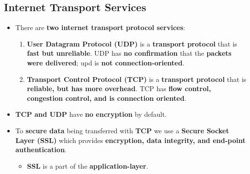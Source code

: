 \documentclass[16pt]{article}
\begin{document}
    \subsection*{Internet Transport Services}
    \begin{itemize}
        \item There are \textbf{two internet transport protocol services}:
        \begin{enumerate}
            \item \textbf{User Datagram Protocol (UDP)} is a \textbf{transport protocol} that is \textbf{fast but unreliable}. UDP has \textbf{no confirmation} that the \textbf{packets were delivered}; upd is \textbf{not connection-oriented}.
            \item \textbf{Transport Control Protocol (TCP)} is a \textbf{transport protocol} that is \textbf{reliable, but has more overhead}. TCP has \textbf{flow control, congestion control, and is connection oriented}.
        \end{enumerate}
        \item \textbf{TCP and UDP} have \textbf{no encryption} by default.
        \item To \textbf{secure data} being transferred with \textbf{TCP} we use a \textbf{Secure Socket Layer (SSL)} which provides \textbf{encryption, data integrity, and end-point authentication}.
        \begin{itemize}
            \item \textbf{SSL} is a part of the \textbf{application-layer}.
        \end{itemize}
    \end{itemize}

    \section*{}
\end{document}
